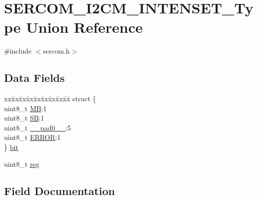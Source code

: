 \hypertarget{union_s_e_r_c_o_m___i2_c_m___i_n_t_e_n_s_e_t___type}{}\section{S\+E\+R\+C\+O\+M\+\_\+\+I2\+C\+M\+\_\+\+I\+N\+T\+E\+N\+S\+E\+T\+\_\+\+Type Union Reference}
\label{union_s_e_r_c_o_m___i2_c_m___i_n_t_e_n_s_e_t___type}


{\ttfamily \#include $<$sercom.\+h$>$}

\subsection*{Data Fields}
\begin{DoxyCompactItemize}
\item 
\begin{tabbing}
xx\=xx\=xx\=xx\=xx\=xx\=xx\=xx\=xx\=\kill
struct \{\\
\>uint8\_t \mbox{\hyperlink{union_s_e_r_c_o_m___i2_c_m___i_n_t_e_n_s_e_t___type_a01b7d76b02f32a7dcf9b9918ad43c95f}{MB}}:1\\
\>uint8\_t \mbox{\hyperlink{union_s_e_r_c_o_m___i2_c_m___i_n_t_e_n_s_e_t___type_af6e25191020f32790ed358bdb7152678}{SB}}:1\\
\>uint8\_t \mbox{\hyperlink{union_s_e_r_c_o_m___i2_c_m___i_n_t_e_n_s_e_t___type_a8b4eebe79ded0459acec2f4950102ba3}{\_\_pad0\_\_}}:5\\
\>uint8\_t \mbox{\hyperlink{union_s_e_r_c_o_m___i2_c_m___i_n_t_e_n_s_e_t___type_a4be51829c8720b7d159b77c39924afaa}{ERROR}}:1\\
\} \mbox{\hyperlink{union_s_e_r_c_o_m___i2_c_m___i_n_t_e_n_s_e_t___type_add90f5708b35a0313f9e5427e9ad95d5}{bit}}\\

\end{tabbing}\item 
uint8\+\_\+t \mbox{\hyperlink{union_s_e_r_c_o_m___i2_c_m___i_n_t_e_n_s_e_t___type_a9428adc9af4653a2050e2536b55dec8d}{reg}}
\end{DoxyCompactItemize}


\subsection{Field Documentation}
\mbox{\label{union_s_e_r_c_o_m___i2_c_m___i_n_t_e_n_s_e_t___type_a8b4eebe79ded0459acec2f4950102ba3}} 
